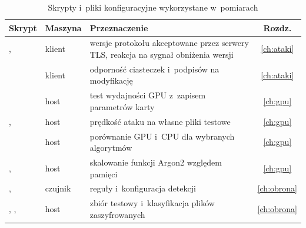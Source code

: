 \begin{table}[htbp]
\centering\small
\begin{tabularx}{\textwidth}{@{}>{\raggedright\arraybackslash}p{5.2cm}l L c@{}}
\toprule
\textbf{Skrypt} & \textbf{Maszyna} & \textbf{Przeznaczenie} & \textbf{Rozdz.} \\
\midrule
{},  & klient & wersje protokołu akceptowane przez serwery TLS, reakcja na sygnał obniżenia wersji & \ref{ch:ataki} \\
 & klient & odporność ciasteczek i~podpisów na modyfikację & \ref{ch:ataki} \\
 & host & test wydajności GPU z~zapisem parametrów karty & \ref{ch:gpu} \\
,  & host & prędkość ataku na własne pliki testowe & \ref{ch:gpu} \\
 & host & porównanie GPU i~CPU dla wybranych algorytmów & \ref{ch:gpu} \\
,  & host & skalowanie funkcji Argon2 względem pamięci & \ref{ch:gpu} \\
,  & czujnik & reguły i~konfiguracja detekcji & \ref{ch:obrona} \\
, ,  & host & zbiór testowy i~klasyfikacja plików zaszyfrowanych & \ref{ch:obrona} \\
\bottomrule
\end{tabularx}
\caption{Skrypty i~pliki konfiguracyjne wykorzystane w~pomiarach}
\label{tab:skrypty}
\end{table}
